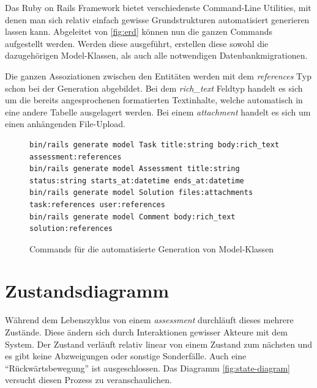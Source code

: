 Das Ruby on Rails Framework bietet verschiedenste Command-Line Utilities, mit denen man sich relativ einfach gewisse
Grundstrukturen automatisiert generieren lassen kann. Abgeleitet von \ref{fig:erd} können nun die ganzen Commands aufgestellt werden.
Werden diese ausgeführt, erstellen diese sowohl die dazugehörigen Model-Klassen, als auch alle notwendigen Datenbankmigrationen.

Die ganzen Assoziationen zwischen den Entitäten werden mit dem \emph{references} Typ schon bei der Generation abgebildet.
Bei dem \emph{rich\_text} Feldtyp handelt es sich um die bereits angesprochenen formatierten Textinhalte,
welche automatisch in eine andere Tabelle ausgelagert werden. Bei einem \emph{attachment} handelt es sich um einen anhängenden File-Upload.

\begin{figure}[H]
\begin{codebox}
\begin{verbatim}
bin/rails generate model Task title:string body:rich_text assessment:references
bin/rails generate model Assessment title:string status:string starts_at:datetime ends_at:datetime
bin/rails generate model Solution files:attachments task:references user:references
bin/rails generate model Comment body:rich_text solution:references 
\end{verbatim}
\end{codebox}
\caption{\label{fig:generate-models}Commands für die automatisierte Generation von Model-Klassen}
\end{figure}

\newpage

\section{Zustandsdiagramm}

Während dem Lebenszyklus von einem \emph{assessment} durchläuft dieses mehrere Zustände. Diese ändern
sich durch Interaktionen gewisser Akteure mit dem System. Der Zustand verläuft relativ linear von einem Zustand zum nächsten und es gibt keine Abzweigungen
oder sonstige Sonderfälle. Auch eine \enquote{Rückwärtsbewegung} ist ausgeschlossen. Das Diagramm \ref{fig:state-diagram} versucht diesen Prozess zu veranschaulichen.

